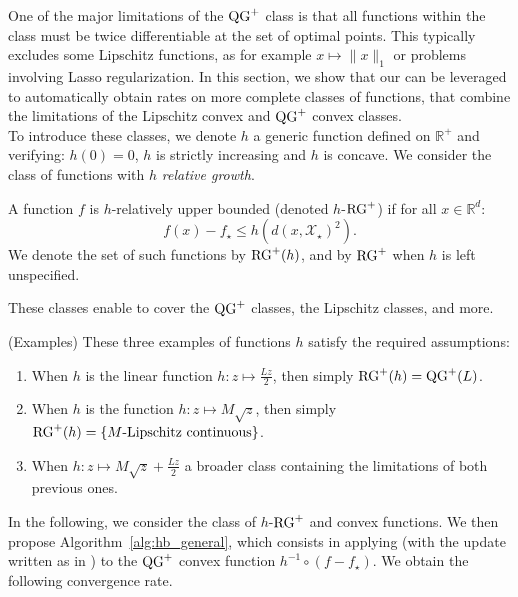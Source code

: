     One of the major limitations of the $\operatorname{QG}^+$ class is that all functions within the class must be twice differentiable at the set of optimal points. This typically excludes some Lipschitz functions, as for example $x \mapsto \|x\|_1$ or problems involving Lasso regularization. In this section, we show that our  can be leveraged to automatically obtain rates on more complete classes of functions, that combine the limitations of the Lipschitz convex and $\operatorname{QG}^+$ convex classes.\\
    To introduce these classes, we denote $h$ a generic function defined on $\mathbb{R}^+$ and verifying: $h(0)=0$, $h$ is strictly increasing and $h$ is concave. We consider the class of functions with $h$ \textit{relative growth}.
    \begin{Def}
        A function $f$ is $h$-relatively upper bounded (denoted $h$-$\operatorname{RG}^+$) if for all $x \in \mathbb{R}^d$: \[f(x)-f_\star \leq h\left( d(x, \mathcal{X}_\star)^2 \right).\]
        We denote the set of such functions by $\operatorname{RG}^+(h)$, and by $\operatorname{RG}^+$ when $h$ is left unspecified.
        \label{def:h_rg}
    \end{Def}
    These classes enable to cover the $\operatorname{QG}^+$ classes, the Lipschitz classes, and more.
    \begin{Rem}(Examples)
        \label{rem:h_linear}
        These three examples of functions $h$ satisfy the required assumptions:
        \begin{enumerate}[noitemsep, topsep=1pt,leftmargin=*]
            \item When $h$ is the linear function $h: z \mapsto \frac{Lz}{2}$, then simply $\operatorname{RG}^+(h) = \operatorname{QG}^+(L)$.
            \item When $h$ is the function $h: z \mapsto M\sqrt{z}$, then simply $\operatorname{RG}^+(h) = \left\{ M\text{-Lipschitz continuous}\right\}$.
            \item When $h: z \mapsto M\sqrt{z} + \frac{Lz}{2}$ a broader class  containing the limitations of both previous ones.
        \end{enumerate}
    \end{Rem}
    In the following, we consider the class of $h$-$\operatorname{RG}^+$ and convex functions. We then propose Algorithm~\ref{alg:hb_general}, which consists in applying  (with the update written as in ) to the $\operatorname{QG}^+$ convex function $h^{-1} \circ (f - f_\star)$. We obtain the following convergence rate.
    
